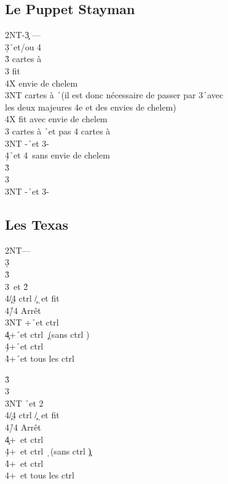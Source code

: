 \documentclass[a4paper]{article}
\begin{document}
\subsection{Le Puppet Stayman}

\begin{bidtable}
2NT-3\c \> ---\\
3\d {}\h\ et/ou 4\s \+\\
3\h {} cartes à \s \+\\
3\s \> fit \s \+\\
4X \> envie de chelem\-\\
3NT  cartes à \h\ (il est donc nécessaire de passer par 3\h\ avec\\
\>les deux majeures 4e et des envies de chelem)\\
\>4X fit avec envie de chelem\-\\
3\s {} cartes à \h\ et pas 4 cartes à \s \\
3NT -\h\ et 3-\s \\
4\d {}\h\ et 4\s\ sans envie de chelem\-\\
3\h {}\h \\
3\s {}\s \\
3NT -\h\ et 3-\s 
\end{bidtable}

\subsection{Les Texas}

\begin{bidtable}
2NT---\\
3\d\+\\
3\h {}\h \\
3\s {}\s\ et 2\h \+\\
4\c/4\d \> ctrl \c /\d\ et fit \s \\
4\h/4\s \> Arrêt\-\\
3NT +\h\ et ctrl \s \\
4\c {}+\h\ et ctrl \c\ (sans ctrl \s )\\
4\d {}+\h\ et ctrl \d \\
4\h {}+\h\ et tous les ctrl\-
\end{bidtable}

\begin{bidtable}
3\h\+\\
3\s {}\s \\
3NT \h\ et 2\s \+\\
4\c/4\d \> ctrl \c /\d\ et fit \h \\
4\h/4\s \> Arrêt\-\\
4\c {}+\s\ et ctrl \c \\
4\d {}+\s\ et ctrl \d\ (sans ctrl \c )\\
4\h {}+\s\ et ctrl \h \\
4\s {}+\s\ et tous les ctrl\-
\end{bidtable}
\end{document}
